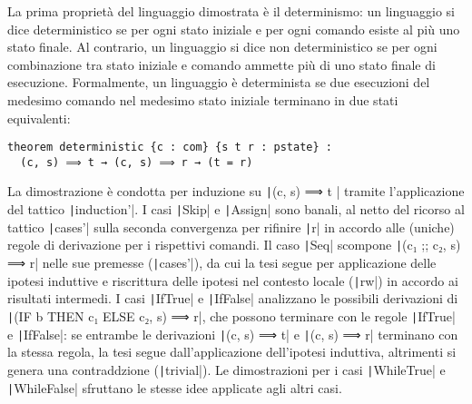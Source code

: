 La prima proprietà del linguaggio dimostrata è il determinismo: un linguaggio si dice deterministico se per ogni stato iniziale e per ogni comando esiste al più uno stato finale. Al contrario, un linguaggio si dice non deterministico se per ogni combinazione tra stato iniziale e comando ammette più di uno stato finale di esecuzione. Formalmente, un linguaggio è determinista se due esecuzioni del medesimo comando nel medesimo stato iniziale terminano in due stati equivalenti:
\begin{verbatim}
theorem deterministic {c : com} {s t r : pstate} :
  (c, s) ⟹ t → (c, s) ⟹ r → (t = r)
\end{verbatim}
La dimostrazione è condotta per induzione su \texttt|(c, s) ⟹ t | tramite l'applicazione del tattico \texttt|induction'|. I casi \texttt|Skip| e \texttt|Assign| sono banali, al netto del ricorso al tattico \texttt|cases'| sulla seconda convergenza per rifinire \texttt|r| in accordo alle (uniche) regole di derivazione per i rispettivi comandi. Il caso \texttt|Seq| scompone \texttt|(c₁ ;; c₂, s) ⟹ r| nelle sue premesse (\texttt|cases'|), da cui la tesi segue per applicazione delle ipotesi induttive e riscrittura delle ipotesi nel contesto locale (\texttt|rw|) in accordo ai risultati intermedi. I casi \texttt|IfTrue| e \texttt|IfFalse| analizzano le possibili derivazioni di \texttt|(IF b THEN c₁ ELSE c₂, s) ⟹ r|, che possono terminare con le regole \texttt|IfTrue| e  \texttt|IfFalse|: se entrambe le derivazioni  \texttt|(c, s) ⟹ t| e \texttt|(c, s) ⟹ r| terminano con la stessa regola, la tesi segue dall'applicazione dell'ipotesi induttiva, altrimenti si genera una contraddzione (\texttt|trivial|). Le dimostrazioni per i casi \texttt|WhileTrue| e \texttt|WhileFalse| sfruttano le stesse idee applicate agli altri casi.
